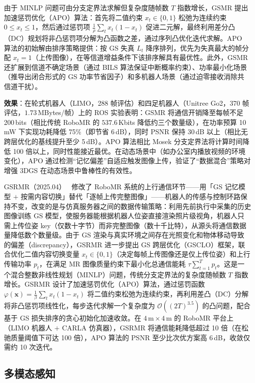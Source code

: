 由于 MINLP 问题可由分支定界法求解但复杂度随帧数 $T$ 指数增长，GSMR 提出加速惩罚优化（APO）算法：首先将二值约束 $x_t \in \{0,1\}$ 松弛为连续约束 $0 \leq x_t \leq 1$，然后通过惩罚项 $\frac{1}{\rho}\sum_t x_t(1 - x_t)$ 促进二元解，最终利用差分凸（DC）规划将非凸惩罚项分解为凸函数之差，通过序列凸优化迭代求解。APO 算法的初始解由排序策略提供：按 GS 失真 $L_t$ 降序排列，优先为失真最大的帧分配 $x_t = 1$（上传图像），在等信道增益条件下该排序解具有最优性。此外，GSMR 还扩展到信道不确定场景（通过 BILS 算法保证中断概率约束）、功率最小化场景（推导出闭合形式的 GS 功率节省因子）和多机器人场景（通过迫零接收消除共信道干扰）。

\textbf{效果}：在轮式机器人（LIMO，288 帧评估）和四足机器人（Unitree Go2，370 帧评估，$1.73$\,MBytes/帧）上的 ROS 实验表明：GSMR 将通信开销降至每帧不足 200\,bits（相比传统 RoboMR 的 $537.6$\,Kbits 降低约三个数量级），在功率预算 10\,mW 下实现功耗降低 75\%（即节省 6\,dB），同时 PSNR 保持 30\,dB 以上（相比无跨层优化的基线提升至少 5\,dB）。APO 算法相比 Mosek 分支定界法将计算时间降低 100 倍以上，同时性能接近最优。在动态场景中（如办公室内播放视频的环境变化），APO 通过检测``记忆偏差''自适应触发图像上传，验证了``数据混合''策略对增强 3DGS 在动态场景中鲁棒性的有效性。

GSRMR（2025.04）~\cite{2504_13697} 修改了 RoboMR 系统的上行通信环节——用「GS 记忆模型 $+$ 按需内容切换」替代「逐帧上传完整图像」——机器人的传感与控制环路保持不变，改变的是与仿真服务器之间的数据传输策略：利用先前执行中采集的历史图像训练 GS 模型，使服务器能根据机器人位姿直接渲染照片级视角，机器人只需上传位姿 key（仅数十字节）而非完整图像（数十千比特），从源头将通信数据量降低数个数量级。由于 GS 渲染与真实环境之间存在光照变化和物体移动导致的偏差（discrepancy），GSRMR 进一步提出 GS 跨层优化（GSCLO）框架，联合优化二值内容切换变量 $x_t \in \{0,1\}$（决定每帧上传图像还是仅上传位姿）和上行传输功率 $p_t$，在满足 MR 图像质量约束下最小化总通信能耗 $\tau \sum_{t=1}^{T} p_t$。这是一个混合整数非线性规划（MINLP）问题，传统分支定界法的复杂度随帧数 $T$ 指数增长。GSRMR 设计了加速惩罚优化（APO）算法，通过惩罚函数 $\varphi(\mathbf{x}) = \frac{1}{\beta}\sum_t x_t(1-x_t)$ 将二值约束松弛为连续约束，再利用差凸（DC）分解将非凸惩罚项线性化，每步迭代求解一个复杂度为 $\mathcal{O}((2T)^{3.5})$ 的凸问题，配合基于 GS 损失排序的贪心初始化加速收敛。在 $4\,\text{m} \times 4\,\text{m}$ 的 RoboMR 平台上（LIMO 机器人 $+$ CARLA 仿真器），GSRMR 将通信能耗降低超过 10 倍（在松驰质量阈值下可达 100 倍），APO 算法的 PSNR 至少比次优方案高 6\,dB，收敛仅需约 10 次迭代。

\subsection{多模态感知}
\label{ss:17_3b}

